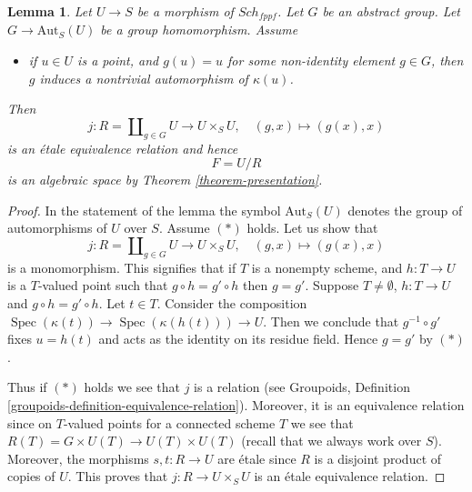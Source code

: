 \documentclass[10pt,a4paper]{amsart}
\theoremstyle{plain}
\newtheorem{lemma}[subsection]{Lemma}
\theoremstyle{definition}
\theoremstyle{remark}
\numberwithin{equation}{subsection}
\def\Spec{\mathop{\mathrm{Spec}}}
\def\Sch{\mathit{Sch}}
\begin{document}
\begin{lemma}
\label{lemma-quotient}
Let $U \to S$ be a morphism of $\Sch_{fppf}$.
Let $G$ be an abstract group. Let $G \to \text{Aut}_S(U)$
be a group homomorphism. Assume
\begin{itemize}
\item[(*)] if $u \in U$ is a point, and $g(u) = u$
for some non-identity element $g \in G$, then $g$
induces a nontrivial automorphism of $\kappa(u)$.
\end{itemize}
Then
$$
j :
R = \coprod\nolimits_{g \in G} U
\longrightarrow
U \times_S U,
\quad
(g, x) \longmapsto (g(x), x)
$$
is an \'etale equivalence relation and hence
$$
F = U/R
$$
is an algebraic space by Theorem \ref{theorem-presentation}.
\end{lemma}

\begin{proof}
In the statement of the lemma the symbol $\text{Aut}_S(U)$ denotes
the group of automorphisms of $U$ over $S$.
Assume $(*)$ holds. Let us show that
$$
j :
R = \coprod\nolimits_{g \in G} U
\longrightarrow
U \times_S U,
\quad
(g, x) \longmapsto (g(x), x)
$$
is a monomorphism. This signifies that if $T$ is a nonempty
scheme, and $h : T \to U$ is a $T$-valued point such that
$g \circ h = g' \circ h$ then $g = g'$. Suppose
$T \not = \emptyset$, $h : T \to U$ and $g \circ h = g' \circ h$.
Let $t \in T$. Consider the composition
$\Spec(\kappa(t)) \to \Spec(\kappa(h(t))) \to U$.
Then we conclude that $g^{-1} \circ g'$ fixes $u = h(t)$ and
acts as the identity on its residue field. Hence $g = g'$ by $(*)$.

\medskip\noindent
Thus if $(*)$ holds we see that $j$ is a relation (see
Groupoids, Definition \ref{groupoids-definition-equivalence-relation}).
Moreover, it is an equivalence relation since on $T$-valued points
for a connected scheme $T$ we see that
$R(T) = G \times U(T) \to U(T) \times U(T)$ (recall that we always
work over $S$). Moreover, the morphisms $s, t : R \to U$ are \'etale
since $R$ is a disjoint product of copies of $U$.
This proves that $j : R \to U \times_S U$ is an \'etale equivalence relation.
\end{proof}
\end{document}
